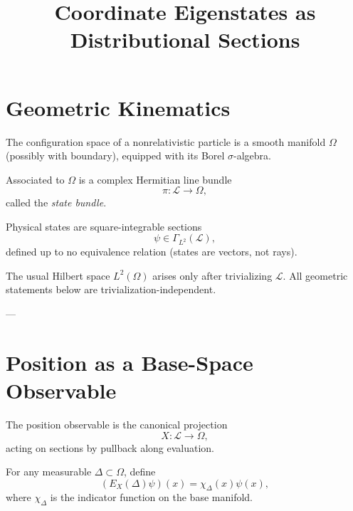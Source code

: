 \documentclass[11pt]{article}
\title{Coordinate Eigenstates as Distributional Sections}
\begin{document}
\maketitle


\section{Geometric Kinematics}

\begin{axiom}
The configuration space of a nonrelativistic particle is a smooth manifold
$\Omega$ (possibly with boundary), equipped with its Borel $\sigma$-algebra.
\end{axiom}

\begin{axiom}
Associated to $\Omega$ is a complex Hermitian line bundle
\[
\pi : \mathcal L \to \Omega ,
\]
called the \emph{state bundle}.
\end{axiom}

\begin{axiom}
Physical states are square-integrable sections
\[
\psi \in \Gamma_{L^2}(\mathcal L),
\]
defined up to no equivalence relation (states are vectors, not rays).
\end{axiom}

\begin{remark}
The usual Hilbert space $L^2(\Omega)$ arises only after trivializing
$\mathcal L$. All geometric statements below are trivialization-independent.
\end{remark}

---

\section{Position as a Base-Space Observable}

\begin{axiom}
The position observable is the canonical projection
\[
X : \mathcal L \to \Omega ,
\]
acting on sections by pullback along evaluation.
\end{axiom}

\begin{definition}
For any measurable $\Delta \subset \Omega$, define
\[
(E_X(\Delta)\psi)(x) = \chi_\Delta(x)\psi(x),
\]
where $\chi_\Delta$ is the indicator function on the base manifold.
\end{definition}
\end{document}
